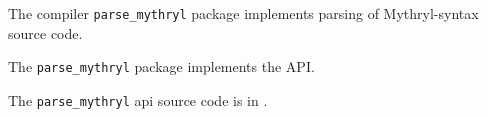 
The compiler {\tt parse\_mythryl} package implements parsing of Mythryl-syntax source code.

The {\tt parse\_mythryl} package implements the  API.

The {\tt parse\_mythryl} api source code is in .

